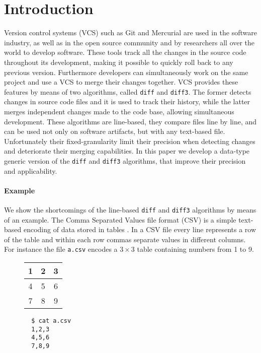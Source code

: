 \documentclass[preprint]{sigplanconf}
\theoremstyle{plain}
\begin{document}
\section{Introduction}
Version control systems (VCS) such as Git \cite{Git} and Mercurial \cite{Mercurial}
are used in the software industry, as well as in the open source community and by researchers all over the world to develop software.
These tools track all the changes in the source code throughout its development, making it possible to quickly roll back to any previous version. Furthermore developers can simultaneously work on the same project and use a VCS to merge their changes together.
VCS provides these features by means of two algorithms, called \texttt{diff} and \texttt{diff3}.
The former detects changes in source code files and it is used to track their history, while the latter merges independent changes made to the code base, allowing simultaneous development.
These algorithms are line-based, they compare files line by line, and can be used not only on software artifacts, but with any text-based file. 
Unfortunately their fixed-granularity limit their precision when detecting changes and deteriorate their merging capabilities. In this paper we develop a data-type generic version of the \texttt{diff} and \texttt{diff3} algorithms, that improve their precision and applicability.

\paragraph{Example}
We show the shortcomings of the line-based \texttt{diff} and \texttt{diff3} algorithms by means of an example.
The Comma Separated Values file format (CSV) is a simple text-based encoding of data stored in tables \cite{csv}.
In a CSV file every line represents a row of the table and within each row commas separate values in different columns.
For instance the file \texttt{a.csv} encodes a $3 \times 3$ table containing numbers from 1 to 9.
\begin{figure}[!h]
\centering
\begin{minipage}{.25\textwidth}
  \centering
  \begin{tabular}{ | c | c | c | }
    \hline
    1 & 2 & 3 \\ \hline
    4 & 5 & 6 \\ \hline
    7 & 8 & 9  \\ \hline
  \end{tabular}
\end{minipage}%
\begin{minipage}{.25\textwidth}
  \centering
  \begin{verbatim}
  $ cat a.csv
  1,2,3
  4,5,6
  7,8,9
  \end{verbatim}
\end{minipage}%
\end{figure}
\end{document}
